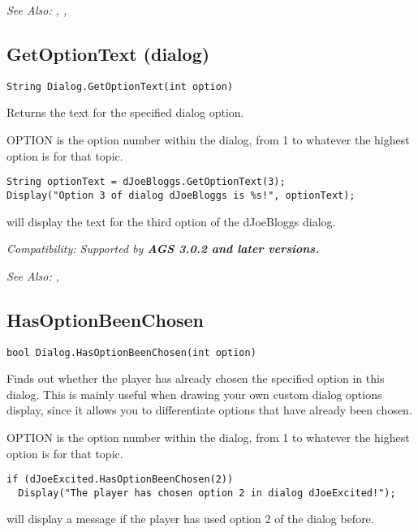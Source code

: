 \it{See Also:} ,
,


\subsection{GetOptionText (dialog)}\label{Dialog.GetOptionText}%

\begin{verbatim}
String Dialog.GetOptionText(int option)
\end{verbatim}
Returns the text for the specified dialog option.

OPTION is the option number within the dialog, from 1 to whatever the
highest option is for that topic.

\begin{verbatim}
String optionText = dJoeBloggs.GetOptionText(3);
Display("Option 3 of dialog dJoeBloggs is %s!", optionText);
\end{verbatim}
will display the text for the third option of the dJoeBloggs dialog.

\it{Compatibility:} Supported by \bf{AGS 3.0.2} and later versions.

\it{See Also:} ,


\subsection{HasOptionBeenChosen}\label{Dialog.HasOptionBeenChosen}%

\begin{verbatim}
bool Dialog.HasOptionBeenChosen(int option)
\end{verbatim}
Finds out whether the player has already chosen the specified option in this
dialog. This is mainly useful when drawing your own custom dialog options
display, since it allows you to differentiate options that have already been chosen.

OPTION is the option number within the dialog, from 1 to whatever the
highest option is for that topic.

\begin{verbatim}
if (dJoeExcited.HasOptionBeenChosen(2))
  Display("The player has chosen option 2 in dialog dJoeExcited!");
\end{verbatim}
will display a message if the player has used option 2 of the dialog before.


